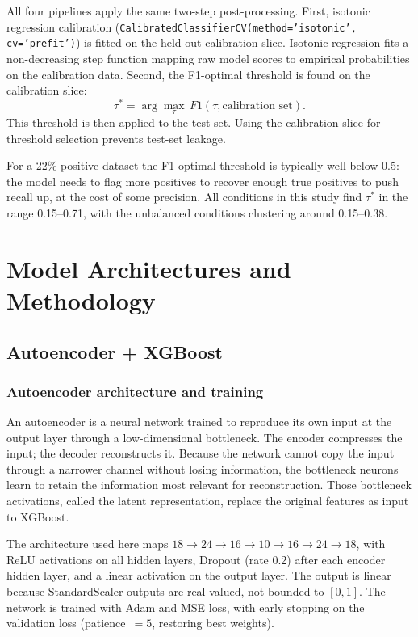 \documentclass[12pt,a4paper]{article}
\begin{document}
All four pipelines apply the same two-step post-processing. First, isotonic
regression calibration (\texttt{CalibratedClassifierCV(method='isotonic',
cv='prefit')}) is fitted on the held-out calibration slice. Isotonic
regression fits a non-decreasing step function mapping raw model scores to
empirical probabilities on the calibration data. Second, the F1-optimal
threshold is found on the calibration slice:
\[
  \tau^* = \arg\max_\tau \, F1(\tau, \text{calibration set}).
\]
This threshold is then applied to the test set. Using the calibration slice
for threshold selection prevents test-set leakage.

For a 22\%-positive dataset the F1-optimal threshold is typically well below
0.5: the model needs to flag more positives to recover enough true positives
to push recall up, at the cost of some precision. All conditions in this
study find $\tau^*$ in the range 0.15--0.71, with the unbalanced conditions
clustering around 0.15--0.38.

\section{Model Architectures and Methodology}
\label{sec:method}

\subsection{Autoencoder + XGBoost}

\subsubsection*{Autoencoder architecture and training}

An autoencoder is a neural network trained to reproduce its own input at
the output layer through a low-dimensional bottleneck. The encoder
compresses the input; the decoder reconstructs it. Because the network
cannot copy the input through a narrower channel without losing information,
the bottleneck neurons learn to retain the information most relevant for
reconstruction. Those bottleneck activations, called the latent
representation, replace the original features as input to XGBoost.

The architecture used here maps $18 \to 24 \to 16 \to 10 \to 16 \to 24 \to 18$,
with ReLU activations on all hidden layers, Dropout (rate 0.2) after each
encoder hidden layer, and a linear activation on the output layer. The output
is linear because StandardScaler outputs are real-valued, not bounded to
$[0,1]$. The network is trained with Adam and MSE loss, with early stopping
on the validation loss (patience~$= 5$, restoring best weights).
\end{document}
